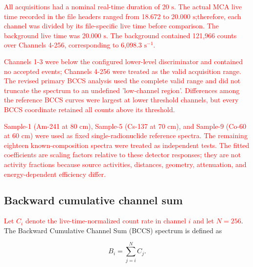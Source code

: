 \documentclass[pdflatex,sn-mathphys-num, table]{sn-jnl}%
\theoremstyle{thmstyleone}%
\theoremstyle{thmstyletwo}%
\theoremstyle{thmstylethree}%
\begin{document}
\textcolor{red}{All acquisitions had a nominal real-time duration of 20 $\text{s}$. The actual MCA live time recorded in the file headers ranged from 18.672 to  20.000 $\text{s}$;therefore, each channel was divided by its file-specific live time before comparison. The background live time was 20.000 $\text{s}$. The  background contained 121,966 counts over Channels 4-256, corresponding to 6,098.3 $\text{s}^{-1}$.}

\textcolor{red}{Channels 1-3 were below the configured lower-level discriminator and contained no  accepted  events; Channels 4-256 were treated as the valid acquisition range. The revised primary BCCS analysis used the complete valid range and did not truncate the spectrum to an undefined 'low-channel region'. Differences among the reference BCCS curves were largest at lower threshold channels, but every  BCCS coordinate retained all counts above its threshold.}


\textcolor{red}{Sample-1 (Am-241 at 80 cm), Sample-5 (Cs-137 at 70 cm), and Sample-9 (Co-60 at 60 cm) were used as fixed single-radionuclide reference spectra. The remaining eighteen known-composition spectra were treated as independent tests. The fitted coefficients are scaling factors relative to these detector responses; they are not activity fractions because source activities, distances, geometry,  attenuation, and energy-dependent efficiency differ.} 

\subsection*{Backward cumulative channel sum}

\textcolor{red}{Let $C_i$ denote the live-time-normalized count rate in channel $i$ and let $N=256$}. The Backward Cumulative Channel Sum (BCCS) spectrum is defined as

\begin{equation}
    B_i = \sum_{j=i}^N C_j.
\end{equation}
\end{document}
